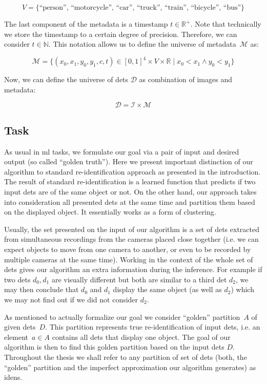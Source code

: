 $$V = \{\text{``person'', ``motorcycle'', ``car'', ``truck'', ``train'', ``bicycle'', ``bus''\}}$$

The last component of the metadata is a timestamp $t \in \mathbb{R}^+$. Note that
technically we store the timestamp to a certain degree of precision. Therefore,
we can consider $t \in \mathbb{N}$. This notation allows us to define
the universe of metadata~$\mathcal{M}$ as:

$$\mathcal{M} = \{{(x_0, x_1, y_0, y_1, c, t) \in [0,1]^4 \times V \times \mathbb{R} \mid x_0 < x_1 \land y_0 < y_1}\}$$

Now, we can define the universe of \glspl{det} $\mathcal{D}$ as combination
of images and metadata:

$$\mathcal{D} = \mathcal{I \times M}$$

\subsection{Task}

As usual in \gls{ml} tasks, we formulate our goal via a pair of input and
desired output (so called ``golden truth''). Here we present important
distinction of our algorithm to standard re-identification approach as presented
in the introduction. The result of standard re-identification is a learned
function that predicts if two input \glspl{det} are of the same object or not.
On the other hand, our approach takes into consideration all presented
\glspl{det} at the same time and partition them based on the displayed object.
It essentially works as a form of clustering.

Usually, the set presented on the input of our algorithm is a set of
\glspl{det} extracted from simultaneous recordings from the cameras placed close
together (i.e. we can expect objects to move from one camera 
to another, or even to be recorded by multiple cameras at the same time).
Working in the context of the whole
set of \glspl{det} gives our algorithm an extra information during the inference.
For example if two \glspl{det} $d_0, d_1$ are visually 
different but both are similar to a third \gls{det} $d_2$, we may then 
conclude that $d_0$ and $d_1$ display the same object (as well as $d_2$) which
we may not find out if we did not consider $d_2$.

As mentioned to actually formalize our goal we consider ``golden'' 
partition~$A$ of given \glspl{det}~$D$. This partition represents true
re-identification of input \glspl{det}, i.e. an element~$a \in A$ contains
all \glspl{det} that display one object. The goal of our algorithm is then
to find this golden partition based on the input \glspl{det} $D$. Throughout
the thesis we shall refer to any partition of set of \glspl{det} (both, the
``golden'' partition and the imperfect approximation our algorithm generates) as
\glspl{iden}.

